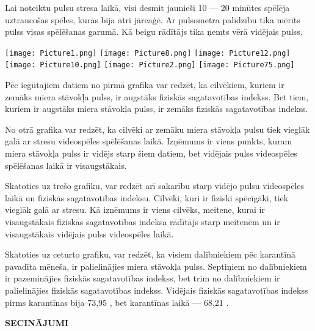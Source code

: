 \documentclass[12pt]{article}
\begin{document}
Lai noteiktu pulsu stresa laikā, visi desmit jaunieši 10 — 20 minūtes spēlēja uztraucošas spēles, kurās bija ātri jāreaģē. Ar pulsometra palīdzību tika mērīts pulss visas spēlēšanas garumā. Kā beigu rādītājs tika ņemts vērā vidējais pulss.


\begin{center}
\texttt{[image: Picture1.png]}
\texttt{[image: Picture8.png]}
\texttt{[image: Picture12.png]}
\texttt{[image: Picture10.png]}
\texttt{[image: Picture2.png]}
\hspace{47mm}
\texttt{[image: Picture75.png]}
\end{center}

Pēc iegūtajiem datiem no pirmā grafika var redzēt, ka cilvēkiem, kuriem ir zemāks miera stāvokļa pulss, ir augstāks fiziskās sagatavotības indekss. Bet tiem, kuriem ir augstāks miera stāvokļa pulss, ir zemāks fiziskās sagatavotības indekss. \par
No otrā grafika var redzēt, ka cilvēki ar zemāku miera stāvokļa pulsu tiek vieglāk galā ar stresu videospēles spēlēšanas laikā. Izņēmums ir viens punkts, kuram miera stāvokļa pulss ir vidējs starp šiem datiem, bet vidējais pulss videospēles spēlēšanas laikā ir visaugstākais. \par
Skatoties uz trešo grafiku, var redzēt arī sakarību starp vidējo pulsu videospēles laikā un fiziskās sagatavotības indeksu. Cilvēki, kuri ir fiziski spēcīgāki, tiek vieglāk galā ar stresu. Kā izņēmums ir viens cilvēks, meitene, kurai ir visaugstākais fiziskās sagatavotības indeksa rādītājs starp meitenēm un ir visaugstākais vidējais pulss videospēles laikā. \par
Skatoties uz ceturto grafiku, var redzēt, ka visiem dalībniekiem pēc karantīnā pavadīta mēneša, ir palielinājies miera stāvokļa pulss. Septiņiem no dalībniekiem ir pazeminājies fiziskās sagatavotības indekss, bet trim no dalībniekiem ir palielinājies fiziskās sagatavotības indekss. Vidējais fiziskās sagatavotības indekss pirms karantīnas bija 73,95 , bet karantīnas laikā — 68,21 .

\newpage
\begin{center}
{\Large \bf SECINĀJUMI}
\end{center}
\end{document}
